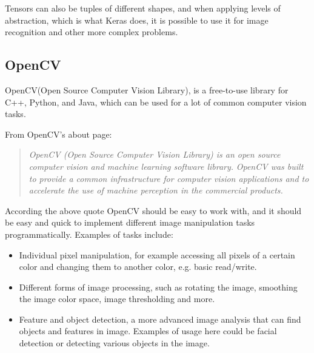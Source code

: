 Tensors can also be tuples of different shapes, and when applying levels of abstraction, which is what Keras does, it is possible to use it for image recognition and other more complex problems.

\subsection{OpenCV}
OpenCV(Open Source Computer Vision Library), is a free-to-use library for C++, Python, and Java, which can be used for a lot of common computer vision tasks\cite{opencv}.

From OpenCV's about page:
\begin{quote}
\textit{OpenCV (Open Source Computer Vision Library) is an open source computer vision and machine learning software library.}
\textit{OpenCV was built to provide a common infrastructure for computer vision applications and to accelerate the use of machine perception in the commercial products\cite{opencvabout}.}
\end{quote}
According the above quote OpenCV should be easy to work with, and it should be easy and quick to implement different image manipulation tasks programmatically.
Examples of tasks include\cite{opencvexamples}:
\begin{itemize}[noitemsep]
	\item Individual pixel manipulation, for example accessing all pixels of a certain color and changing them to another color, e.g. basic read/write.
	\item Different forms of image processing, such as rotating the image, smoothing the image color space, image thresholding and more.
	\item Feature and object detection, a more advanced image analysis that can find objects and features in image. 
	Examples of usage here could be facial detection or detecting various objects in the image.
\end{itemize}

